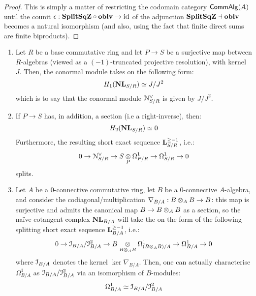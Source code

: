                     \begin{proof}
                        This is simply a matter of restricting the codomain category $\mathsf{Comm}\mathsf{Alg}(\mathcal{A})$ until the counit $\epsilon: \mathbf{Split}\mathbf{Sq}\mathbf{Z} \circ \mathbf{oblv} \to \mathrm{id}$ of the adjunction $\mathbf{Split}\mathbf{Sq}\mathbf{Z} \dashv \mathbf{oblv}$ becomes a natural isomorphism (and also, using the fact that finite direct sums are finite biproducts).
                    \end{proof}
                
                \begin{theorem} \label{theorem: computing_naive_cotangent_complexes}
                    \noindent
                    \begin{enumerate}
                        \item Let $R$ be a base commutative ring and let $P \to S$ be a surjective map between $R$-algebras (viewed as a $(-1)$-truncated projective resolution), with kernel $J$. Then, the conormal module takes on the following form:
                            $$H_1(\mathbf{NL}_{S/R}) \simeq J/J^2$$
                        which is to say that the conormal module $\mathcal{N}^{\vee}_{S/R}$ is given by $J/J^2$.
                        \item If $P \to S$ has, in addition, a section (i.e a right-inverse), then:
                            $$H_2(\mathbf{NL}_{S/R}) \simeq 0$$
                        Furthermore, the resulting short exact sequence $\mathbf{L}_{S/R}^{\geq -1}$, i.e.:
                            $$0 \to \calN^{\vee}_{S/R} \to S \tensor_P \Omega^1_{P/R} \to \Omega^1_{S/R} \to 0$$
                        splits.
                        \item Let $A$ be a $0$-connective commutative ring, let $B$ be a $0$-connective $A$-algebra, and consider the codiagonal/multiplication $\nabla_{B/A}: B \tensor_A B \to B$: this map is surjective and admits the canonical map $B \to B \tensor_A B$ as a section, so the na\"ive cotangent complex $\mathbf{NL}_{B/A}$ will take the on the form of the following splitting short exact sequence $\mathbf{L}_{B/A}^{\geq -1}$, i.e.:
                            $$0 \to \calI_{B/A}/\calI_{B/A}^2 \to B \tensor_{B \tensor_A B} \Omega^1_{(B \tensor_A B)/A} \to \Omega^1_{B/A} \to 0$$
                        where $\mathcal{I}_{B/A}$ denotes the kernel $\ker \nabla_{B/A}$. Then, one can actually characterise $\Omega^1_{B/A}$ as $\mathcal{I}_{B/A}/\mathcal{I}_{B/A}^2$ via an isomorphism of $B$-modules:
                            $$\Omega^1_{B/A} \simeq \mathcal{I}_{B/A}/\mathcal{I}_{B/A}^2$$
                    \end{enumerate}
                \end{theorem}
